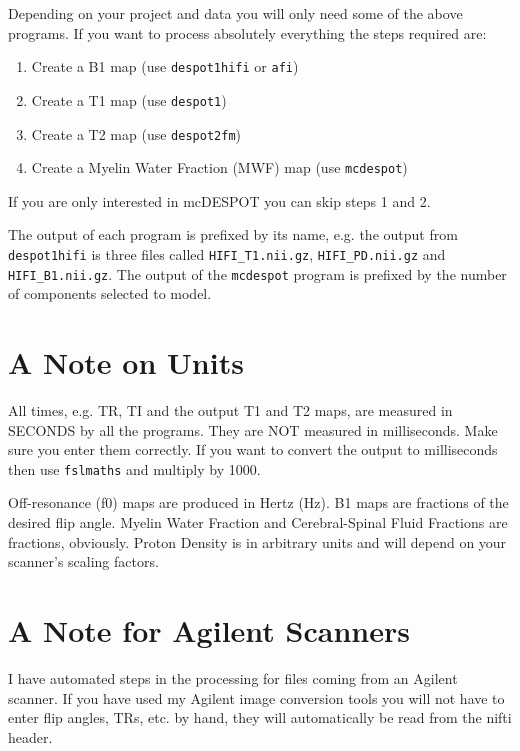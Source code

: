 \documentclass{report}
\begin{document}
Depending on your project and data you will only need some of the above programs. If you want to process absolutely everything the steps required are:

\begin{enumerate}\itemsep1pt \parskip0pt 
	\item Create a B1 map (use \texttt{despot1hifi} or \texttt{afi})
	\item Create a T1 map (use \texttt{despot1})
	\item Create a T2 map (use \texttt{despot2fm})
	\item Create a Myelin Water Fraction (MWF) map (use \texttt{mcdespot})
\end{enumerate}

If you are only interested in mcDESPOT you can skip steps 1 and 2.

The output of each program is prefixed by its name, e.g. the output from \texttt{despot1hifi} is three files called \texttt{HIFI\_T1.nii.gz}, \texttt{HIFI\_PD.nii.gz} and \texttt{HIFI\_B1.nii.gz}. The output of the \texttt{mcdespot} program is prefixed by the number of components selected to model.

\section{A Note on Units}

All times, e.g. TR, TI and the output T1 and T2 maps, are measured in SECONDS by all the programs. They are NOT measured in milliseconds. Make sure you enter them correctly. If you want to convert the output to milliseconds then use \texttt{fslmaths} and multiply by 1000.

Off-resonance (f0) maps are produced in Hertz (Hz). B1 maps are fractions of the desired flip angle. Myelin Water Fraction and Cerebral-Spinal Fluid Fractions are fractions, obviously. Proton Density is in arbitrary units and will depend on your scanner's scaling factors.

\section{A Note for Agilent Scanners}

I have automated steps in the processing for files coming from an Agilent scanner. If you have used my Agilent image conversion tools you will not have to enter flip angles, TRs, etc. by hand, they will automatically be read from the nifti header.
\end{document}
